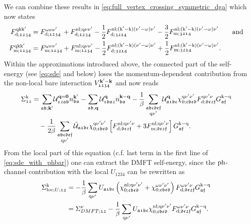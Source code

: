 \documentclass[../../main.tex]{subfiles}
\begin{document}
We can combine these results in \eqref{eq:full_vertex_crossing_symmetric_dga} which now states
\begin{subequations}
\begin{align}
	F^{\text{q}\text{k}\text{k}'}_{\text{d};\mathfrak{1234}}&=F^{\omega\nu\nu'}_{\text{d};\mathfrak{1234}}\,+F^{\text{nl};\text{q}\nu\nu'}_{\text{d};\mathfrak{1234}}-\frac12 F_{\text{d};\mathfrak{3214}}^{\text{nl};(\text{k}'-\text{k})(\nu'-\omega)\nu'}-\frac32 F_{\text{m};\mathfrak{3214}}^{\text{nl};(\text{k}'-\text{k})(\nu'-\omega)\nu'}\qquad\text{and}\\
	F^{\text{q}\text{k}\text{k}'}_{\text{m};\mathfrak{1234}}&=F^{\omega\nu\nu'}_{\text{m};\mathfrak{1234}}+F^{\text{nl};\text{q}\nu\nu'}_{\text{m};\mathfrak{1234}}-\frac12 F_{\text{d};\mathfrak{3214}}^{\text{nl};(\text{k}'-\text{k})(\nu'-\omega)\nu'}+\frac12 F_{\text{m};\mathfrak{3214}}^{\text{nl};(\text{k}'-\text{k})(\nu'-\omega)\nu'}.
\end{align}
\end{subequations}
Within the approximations introduced above, the connected part of the self-energy (see \eqref{eq:sde} and below) loses the momentum-dependent contribution from the non-local bare interaction $V^{\textbf{k}'-\textbf{k}}_{\mathfrak{1234}}$ and now reads
\begin{align}\label{eq:sde_with_phbar}
\begin{split}
	\Sigma^{\text{k}}_{\mathfrak{12}}&=\sum_{\mathfrak{ab};\textbf{k}'}\!\mathcal{U}^{\textbf{q}=\textbf{0}}_{\mathfrak{12ab}}n_{\mathfrak{ba}}^{\textbf{k}'}-\sum_{\mathfrak{ab},\textbf{q}}\mathcal{U}^{\textbf{q}}_{\mathfrak{1ba2}}n_{\mathfrak{ba}}^{\textbf{k}-\textbf{q}} -\frac1\beta\sum_{\substack{\mathfrak{abcdef}\\\text{q}\nu'}}\mathcal{U}^{\textbf{q}}_{\mathfrak{a1bc}}\chi^{\text{q}\nu'\nu'}_{0;\mathfrak{cbed}} F^{\text{q}\nu'\nu}_{\text{d};\mathfrak{de2f}} G_{\mathfrak{af}}^{\text{k}-\text{q}}\\
	&\quad -\frac{1}{2\beta}\sum_{\substack{\mathfrak{abcdef}\\\text{q}\nu'}}\tilde{\mathcal{U}}_{\mathfrak{a1bc}}\chi^{\text{q}\nu'\nu'}_{0;\mathfrak{cbed}}\left [F^{\text{nl};\text{q}\nu'\nu}_{\text{d};\mathfrak{de2f}}+3 F^{\text{nl};\text{q}\nu'\nu}_{\text{m};\mathfrak{de2f}}\right ]G_{\mathfrak{af}}^{\text{k}-\text{q}}.
\end{split}
\end{align}
From the local part of this equation (c.f. last term in the first line of \eqref{eq:sde_with_phbar}) one can extract the DMFT self-energy, since the $\text{ph}$-channel contribution with the local $U_{\mathfrak{1234}}$ can be rewritten as
\begin{align}
	\Sigma_{\text{loc};U;\mathfrak{12}}^{\text{k}}&=-\frac{1}{\beta}\sum_{\text{q}\nu'}U_{\mathfrak{a1bc}}\left (\chi^{\text{nl};\text{q}\nu'\nu'}_{0;\mathfrak{cbed}}+\chi^{\omega\nu'\nu'}_{0;\mathfrak{cbed}}\right ) F^{\omega\nu'\nu}_{\text{d};\mathfrak{de2f}} G_{\mathfrak{af}}^{\text{k}-\text{q}}\\
	&=\Sigma_{DMFT;\mathfrak{12}}^{\nu}-\frac{1}{\beta}\sum_{\text{q}\nu'}U_{\mathfrak{a1bc}}\chi^{\text{nl};\text{q}\nu'\nu'}_{0;\mathfrak{cbed}}F^{\omega\nu'\nu}_{\text{d};\mathfrak{de2f}} G_{\mathfrak{af}}^{\text{k}-\text{q}}.
\end{align}
\end{document}
